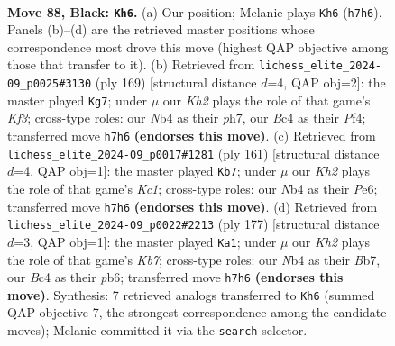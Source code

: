 \documentclass[11pt]{article}
\begin{document}
\clearpage

\begin{figure}[p]\centering
\begin{subfigure}{0.46\textwidth}\centering
\resizebox{\linewidth}{!}{%
\newchessgame
\chessboard[
  setfen={3B4/7k/8/8/1nb4K/8/5P2/8 b - - 22 88},
  showmover=false,
  pgfstyle=straightmove, color=movearrow, markmove={h7-h6}
]}
\caption{}
\end{subfigure}\hfill
\begin{subfigure}{0.46\textwidth}\centering
\resizebox{\linewidth}{!}{%
\newchessgame
\chessboard[
  setfen={8/7P/5k2/8/2K2p2/8/8/5B2 b - - 0 85},
  showmover=false,
  pgfstyle=straightmove, color=movearrow, markmove={f6-g7}
]}
\caption{}
\end{subfigure}
\\[4pt]
\begin{subfigure}{0.46\textwidth}\centering
\resizebox{\linewidth}{!}{%
\newchessgame
\chessboard[
  setfen={2k5/8/4p3/2B5/8/4K3/6b1/8 b - - 58 81},
  showmover=false,
  pgfstyle=straightmove, color=movearrow, markmove={c8-b7}
]}
\caption{}
\end{subfigure}\hfill
\begin{subfigure}{0.46\textwidth}\centering
\resizebox{\linewidth}{!}{%
\newchessgame
\chessboard[
  setfen={8/1b6/1P1B4/8/1K6/8/1k6/8 b - - 6 89},
  showmover=false,
  pgfstyle=straightmove, color=movearrow, markmove={b2-a1}
]}
\caption{}
\end{subfigure}
\caption{\textbf{Move 88, Black: \texttt{Kh6}.} (a) Our position; Melanie plays \texttt{Kh6} (\texttt{h7h6}). Panels (b)--(d) are the retrieved master positions whose correspondence most drove this move (highest QAP objective among those that transfer to it). (b) Retrieved from \texttt{lichess\_elite\_2024-09\_p0025\#3130} (ply 169) [structural distance $d$=4, QAP obj=2]: the master played \texttt{Kg7}; under $\mu$ our \emph{Kh2} plays the role of that game's \emph{Kf3}; cross-type roles: our \emph{N}b4 as their \emph{p}h7, our \emph{B}c4 as their \emph{P}f4; transferred move \texttt{h7h6} \textbf{(endorses this move)}. (c) Retrieved from \texttt{lichess\_elite\_2024-09\_p0017\#1281} (ply 161) [structural distance $d$=4, QAP obj=1]: the master played \texttt{Kb7}; under $\mu$ our \emph{Kh2} plays the role of that game's \emph{Kc1}; cross-type roles: our \emph{N}b4 as their \emph{P}e6; transferred move \texttt{h7h6} \textbf{(endorses this move)}. (d) Retrieved from \texttt{lichess\_elite\_2024-09\_p0022\#2213} (ply 177) [structural distance $d$=3, QAP obj=1]: the master played \texttt{Ka1}; under $\mu$ our \emph{Kh2} plays the role of that game's \emph{Kb7}; cross-type roles: our \emph{N}b4 as their \emph{B}b7, our \emph{B}c4 as their \emph{p}b6; transferred move \texttt{h7h6} \textbf{(endorses this move)}. Synthesis: 7 retrieved analogs transferred to \texttt{Kh6} (summed QAP objective 7, the strongest correspondence among the candidate moves); Melanie committed it via the \texttt{search} selector.}
\label{fig:thought-m175}
\end{figure}
\end{document}
